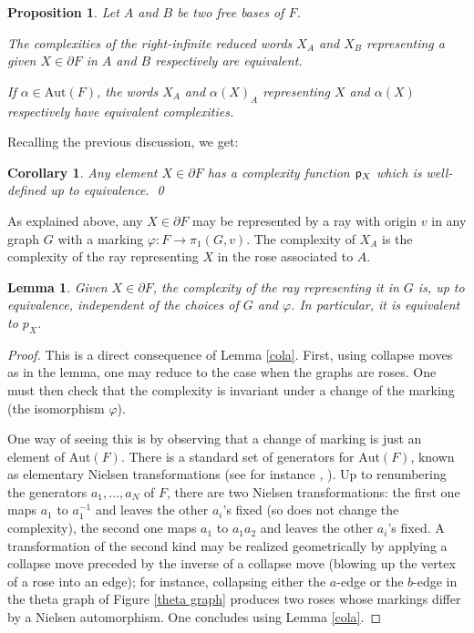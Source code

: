 \documentclass[11pt]{amsart}
\newtheorem{cor}[thm]{Corollary}
\newtheorem{prop}[thm]{Proposition}
\newtheorem{lem}[thm]{Lemma}
\theoremstyle{remark}
\newcommand{\m} {^{-1}}
\newcommand{\Aut} {{\mathrm{Aut}}}
\newcommand{\cp}{{\sf  p}}
\newcommand{\bo}{\partial}
\begin{document}
\begin{prop}\label{compeq}
 Let $A$ and $B$ be two free bases of $F$. 
 
 The complexities of the right-infinite reduced words $X_A$ and $X_B$ representing a given $X\in\bo F$ in $A$ and $B$ respectively are equivalent. 
 
 If $\alpha\in\Aut(F)$, the words $X_A$ and $\alpha(X)_A$ representing $X$ and $\alpha(X)$ respectively have equivalent complexities. 
\end{prop}

Recalling the previous discussion, we get:

\begin{cor} \label{bdef}
 Any element $X\in\bo F$ has a complexity function $\cp_X$ which is well-defined up to equivalence. \qed
\end{cor}


   As explained above,  any $X\in \bo F$ may be represented by a ray with origin $v$ in any   graph $G$ with a marking $\varphi:F\to \pi_1(G,v)$.    The complexity of $X_A$ is the complexity of the ray representing $X$ in the rose associated to $A$.

\begin{lem} \label{crayon}
 Given $X\in \bo F$, the complexity of the ray representing it in $G$ is, up to equivalence, independent of the choices of $G$ and $\varphi$. In particular, it is equivalent to $p_X$.
\end{lem}

\begin{proof}
 This is a   direct consequence of Lemma \ref {cola}. First, using   collapse moves as in the lemma, one may reduce to the case when the graphs are roses. One must then check that the complexity is invariant under a change of the marking (the isomorphism $\varphi$). 
 
   One way of seeing this is by observing that a change of marking is just an element of $\Aut(F)$.    There is a standard   set of generators for $\Aut(F)$, known as elementary Nielsen transformations  (see for instance  \cite{Bogop}, \cite{LS}). Up to renumbering the generators $a_1,\dots,a_N$ of $F$, there are two Nielsen transformations: the first one maps $a_1$ to $a_1\m$ and leaves the other $a_i$'s fixed (so does not change the complexity), the second one maps $a_1$ to $a_1a_2$ and leaves the other $a_i$'s fixed.   A transformation of the second kind may be realized geometrically by applying a collapse move preceded by the inverse of a collapse move (blowing up the vertex of a rose into an edge);  for instance,  collapsing either the  $a$-edge or the $b$-edge   in the theta graph of Figure \ref {theta graph} produces two   roses whose markings differ by a Nielsen automorphism.
   One concludes      
   using Lemma \ref {cola}.
\end{proof}
\end{document}
